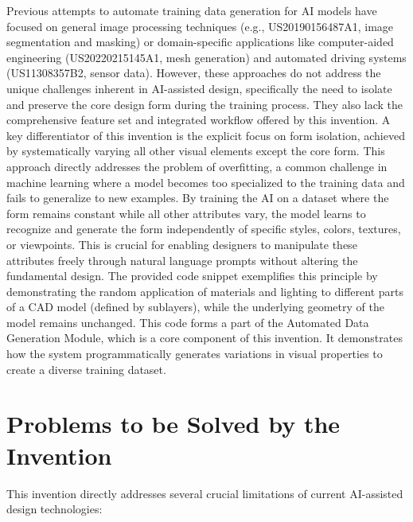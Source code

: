 \documentclass{article}
\begin{document}
Previous attempts to automate training data generation for AI models have focused on general image processing techniques (e.g., US20190156487A1, image segmentation and masking) or domain-specific applications like computer-aided engineering (US20220215145A1, mesh generation) and automated driving systems (US11308357B2, sensor data). However, these approaches do not address the unique challenges inherent in AI-assisted design, specifically the need to isolate and preserve the core design form during the training process. They also lack the comprehensive feature set and integrated workflow offered by this invention. A key differentiator of this invention is the explicit focus on form isolation, achieved by systematically varying all other visual elements except the core form. This approach directly addresses the problem of overfitting, a common challenge in machine learning where a model becomes too specialized to the training data and fails to generalize to new examples. By training the AI on a dataset where the form remains constant while all other attributes vary, the model learns to recognize and generate the form independently of specific styles, colors, textures, or viewpoints. This is crucial for enabling designers to manipulate these attributes freely through natural language prompts without altering the fundamental design. The provided code snippet exemplifies this principle by demonstrating the random application of materials and lighting to different parts of a CAD model (defined by sublayers), while the underlying geometry of the model remains unchanged. This code forms a part of the Automated Data Generation Module, which is a core component of this invention. It demonstrates how the system programmatically generates variations in visual properties to create a diverse training dataset.

\section{Problems to be Solved by the Invention}

This invention directly addresses several crucial limitations of current AI-assisted design technologies:
\end{document}
